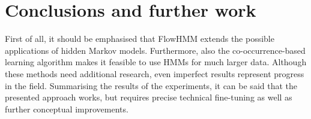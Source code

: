 \documentclass[shortabstract]{iithesis}
\begin{document}








    






\chapter{Conclusions and further work} \label{sec:conc}


First of all, it should be emphasised that FlowHMM extends the possible applications of hidden Markov models. Furthermore, also the co-occurrence-based learning algorithm makes it feasible to use HMMs for much larger data. Although these methods need additional research, even imperfect results represent progress in the field. Summarising the results of the experiments, it can be said that the presented approach works, but requires precise technical fine-tuning as well as further conceptual improvements.
\end{document}
